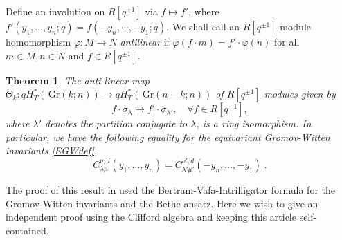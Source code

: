 \documentclass[12pt]{amsart}
\newcommand{\Gr}{\,\mathrm{Gr}}
\newcommand{\ring}{R}
\newtheorem{thm}{Theorem}[section]
\numberwithin{equation}{section}
\numberwithin{figure}{section}
\begin{document}
    Define an involution on $\ring[q^{\pm1}]$ via $f\mapsto f'$, where $f'(y_1,\ldots,y_n;q)=f(-y_n,\cdots,-y_1;q)$. We shall call an $\ring[q^{\pm 1}]$-module homomorphism $\varphi:M\to N$ {\em antilinear} if $\varphi(f\cdot m)=f'\cdot \varphi(n)$ for all $m\in M,n\in N$ and $f\in\ring[q^{\pm 1}]$.
\begin{thm}\label{thm:LRduality}
    The anti-linear map $\Theta_k:qH^*_T(\Gr(k;n))\to qH^*_T(\Gr(n-k;n))$ of $\ring[q^{\pm 1}]$-modules given by
    \begin{equation}\label{Theta}
    f\cdot\sigma_\lambda\mapsto f'\cdot\sigma_{\lambda'},\quad\forall f\in\ring[q^{\pm 1}], 
    \end{equation}
    where $\lambda'$ denotes the partition conjugate to $\lambda$, is a ring isomorphism. In particular, we have the following equality for the equivariant Gromov-Witten invariants \eqref{EGWdef},
    \begin{equation}\label{LRduality}
    C_{\lambda\mu}^{\nu,d}(y_1,\ldots,y_n)=C_{\lambda'\mu'}^{\nu',d}(-y_n,\ldots,-y_1)\;.
    \end{equation}
\end{thm}
    The proof of this result in \cite{gorbounovkorff2014} used the Bertram-Vafa-Intrilligator formula for the Gromov-Witten invariants and the Bethe ansatz. Here we wish to give an independent proof using the Clifford algebra and keeping this article self-contained.
\end{document}
